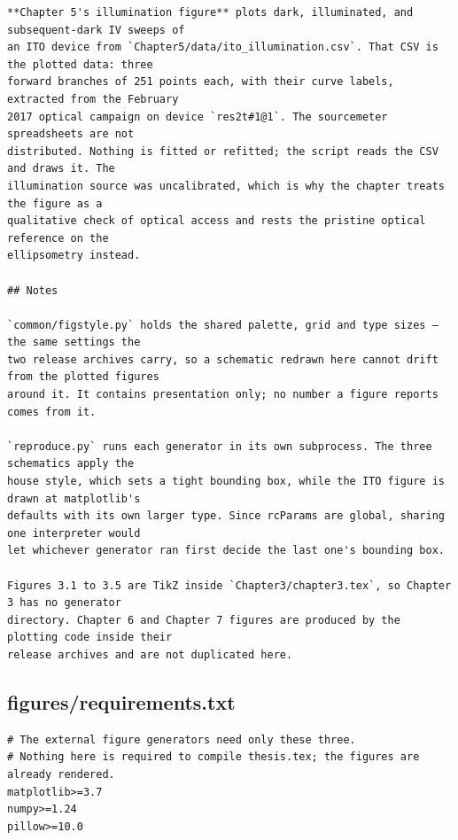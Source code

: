 \documentclass[a4paper,10pt]{article}
\begin{document}
\begin{Verbatim}
**Chapter 5's illumination figure** plots dark, illuminated, and subsequent-dark IV sweeps of
an ITO device from `Chapter5/data/ito_illumination.csv`. That CSV is the plotted data: three
forward branches of 251 points each, with their curve labels, extracted from the February
2017 optical campaign on device `res2t#1@1`. The sourcemeter spreadsheets are not
distributed. Nothing is fitted or refitted; the script reads the CSV and draws it. The
illumination source was uncalibrated, which is why the chapter treats the figure as a
qualitative check of optical access and rests the pristine optical reference on the
ellipsometry instead.

## Notes

`common/figstyle.py` holds the shared palette, grid and type sizes — the same settings the
two release archives carry, so a schematic redrawn here cannot drift from the plotted figures
around it. It contains presentation only; no number a figure reports comes from it.

`reproduce.py` runs each generator in its own subprocess. The three schematics apply the
house style, which sets a tight bounding box, while the ITO figure is drawn at matplotlib's
defaults with its own larger type. Since rcParams are global, sharing one interpreter would
let whichever generator ran first decide the last one's bounding box.

Figures 3.1 to 3.5 are TikZ inside `Chapter3/chapter3.tex`, so Chapter 3 has no generator
directory. Chapter 6 and Chapter 7 figures are produced by the plotting code inside their
release archives and are not duplicated here.
\end{Verbatim}
\subsection{figures/requirements.txt}
\begin{Verbatim}
# The external figure generators need only these three.
# Nothing here is required to compile thesis.tex; the figures are already rendered.
matplotlib>=3.7
numpy>=1.24
pillow>=10.0
\end{Verbatim}
\end{document}
